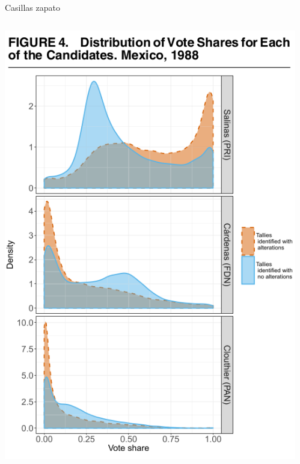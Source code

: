 \documentclass[bigger]{beamer}
\begin{document}
\begin{frame}[label={sec:orgac55f49}]{Casillas zapato}
\begin{columns}
\begin{column}{0.5\columnwidth}
\includegraphics[width=\columnwidth]{./pics/fig4-apsr.png} \\
\end{column}
\begin{column}{0.5\columnwidth}

\end{column}
\end{columns}
\end{frame}
\end{document}
